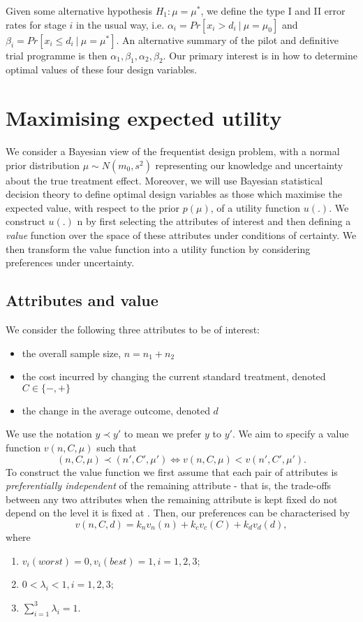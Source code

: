 \documentclass[sagev]{sagej}
\begin{document}
Given some alternative hypothesis $H_1: \mu =\mu^*$, we define the type I and II error rates for stage $i$ in the usual way, i.e. $\alpha_i = Pr[x_i > d_i ~|~ \mu = \mu_0]$ and $\beta_i = Pr[x_i \leq d_i ~|~ \mu = \mu^*]$. An alternative summary of the pilot and definitive trial programme is then  $\alpha_1, \beta_1, \alpha_2, \beta_2$. Our primary interest is in how to determine optimal values of these four design variables.

\section{Maximising expected utility}

We consider a Bayesian view of the frequentist design problem, with a normal prior distribution $\mu \sim N(m_0, s^2)$ representing our knowledge and uncertainty about the true treatment effect. Moreover, we will use Bayesian statistical decision theory to define optimal design variables as those which maximise the expected value, with respect to the prior $p(\mu)$, of a utility function $u(.)$. We construct $u(.)$ n by first selecting the attributes of interest and then defining a \emph{value} function over the space of these attributes under conditions of certainty. We then transform the value function into a utility function by considering preferences under uncertainty.

\subsection{Attributes and value}

We consider the following three attributes to be of interest: 

\begin{itemize}
\item the overall sample size, $n = n_1 + n_2$ 
\item the cost incurred by changing the current standard treatment, denoted $C \in \{-,+\}$
\item the change in the average outcome, denoted $d$
\end{itemize}

We use the notation $y \prec y'$ to mean we prefer $y$ to $y'$. We aim to specify a value function $v(n, C, \mu)$ such that
$$
(n, C, \mu) \prec (n', C', \mu') \Leftrightarrow v(n, C, \mu) < v(n', C', \mu').
$$
To construct the value function we first assume that each pair of attributes is \emph{preferentially independent} of the remaining attribute - that is, the trade-offs between any two attributes when the remaining attribute is kept fixed do not depend on the level it is fixed at \cite{French2000}. Then, our preferences can be characterised by
$$ 
v(n, C, d) = k_n v_n(n) + k_c v_c(C) + k_d v_d(d),
$$
where
\begin{enumerate}
\item $v_i(worst) = 0, v_i(best) = 1, i = 1,2,3$;
\item $0 < \lambda_i < 1, i = 1,2,3$;
\item $\sum_{i=1}^3 \lambda_i = 1$.
\end{enumerate}
\end{document}
